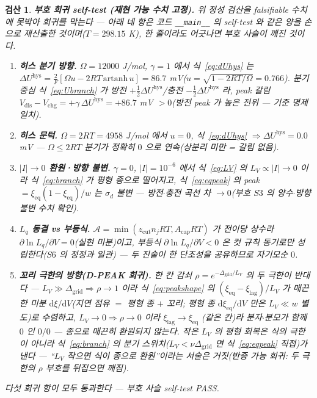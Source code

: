 \documentclass[11pt,a4paper]{article}
\newtheorem*{verifybox}{검산}
\newcommand{\dd}{\mathrm{d}}
\newcommand{\eq}{\mathrm{eq}}
\newcommand{\dis}{\mathrm{dis}}
\newcommand{\chg}{\mathrm{chg}}
\newcommand{\hys}{\mathrm{hys}}
\newcommand{\code}[1]{\texttt{#1}}
\begin{document}
\begin{verifybox}
\textbf{부호 회귀 self-test (재현 가능 수치 고정).} 위 정성 검산을 falsifiable 수치에 못박아 회귀를 막는다 — 아래
네 항은 코드 \code{\_\_main\_\_} 의 self-test 와 같은 양을 손으로 재산출한 것이며($T=298.15$ K), 한 줄이라도 어긋나면
부호 사슬이 깨진 것이다.
\begin{enumerate}[label=\textbf{R\arabic*.},leftmargin=2.6em,itemsep=1pt]
\item \textbf{히스 분기 방향.} $\Omega=12000$ J/mol, $\gamma=1$ 에서 식~\eqref{eq:dUhys} 는
$\Delta U^\hys=\frac{2}{F}[\Omega u-2RT\,\mathrm{artanh}\,u]=86.7$ mV($u=\sqrt{1-2RT/\Omega}=0.766$). 분기 중심
식~\eqref{eq:Ubranch} 가 방전 $+\tfrac12\Delta U^\hys$/충전 $-\tfrac12\Delta U^\hys$ 라, peak 갈림
$V_\dis-V_\chg=+\gamma\,\Delta U^\hys=+86.7$ mV $>0$(방전 peak 가 높은 전위 — 기준 명제 일치).
\item \textbf{히스 문턱.} $\Omega=2RT=4958$ J/mol 에서 $u=0$, 식~\eqref{eq:dUhys} $\Rightarrow\Delta U^\hys=0.0$ mV —
$\Omega\le2RT$ 분기가 정확히 $0$ 으로 연속(상분리 미만 = 갈림 없음).
\item \textbf{$|I|\!\to\!0$ 환원·방향 불변.} $\gamma=0$, $|I|=10^{-6}$ 에서 식~\eqref{eq:LV} 의 $L_V\propto|I|\to0$ 이라
식~\eqref{eq:branch} 가 평형 종으로 떨어지고, 식~\eqref{eq:eqpeak} 의 peak $=\xi_\eq(1-\xi_\eq)/w$ 는 $\sigma_d$ 불변 —
방전$\cdot$충전 곡선 차 $\to0$(부호 $S3$ 의 양수$\cdot$방향 불변 수치 확인).
\item \textbf{$L_q$ 동결 vs 부등식.} $\mathcal A=\min(z_\mathrm{cut}n_jRT,A_\mathrm{cap}RT)$ 가 전이당 상수라
$\partial\ln L_q/\partial V=0$(실현 미분)이고, 부등식 $\partial\ln L_q/\partial V<0$ 은 컷 규칙 동기로만 성립한다($S6$ 의
정정과 일관) — 두 진술이 한 단조성을 공유하므로 자기모순 $0$.
\item \textbf{꼬리 극한의 방향(D-PEAK 회귀).} 한 칸 감쇠 $\rho=e^{-\Delta_\mathrm{grid}/L_V}$ 의 두 극한이 반대다 —
$L_V\!\gg\!\Delta_\mathrm{grid}\Rightarrow\rho\to1$ 이라 식~\eqref{eq:peakshape} 의 $(\xi_\eq-\xi_\mathrm{lag})/L_V$ 가
매끈한 미분 $\dd\xi/\dd V$(지연 점유 $=$ 평형 종 $+$ 꼬리; 평형 종 $\dd\xi_\eq/\dd V$ 만은 $L_V\!\ll\!w$ 별도)로 수렴하고, $L_V\!\to\!0\Rightarrow\rho\to0$ 이라 $\xi_\mathrm{lag}\to\xi_\eq$
(같은 칸)라 분자$\cdot$분모가 함께 $0$ 인 $0/0$ — \emph{종으로 매끈히 환원되지 않는다}. 작은 $L_V$ 의 평형 회복은 식의
극한이 아니라 식~\eqref{eq:branch} 의 분기 스위치($L_V<\nu\Delta_\mathrm{grid}$ 면 식~\eqref{eq:eqpeak} 직접)가 낸다 —
``$L_V$ 작으면 식이 종으로 환원''이라는 서술은 거짓(반증 가능 회귀: 두 극한의 $\rho$ 부호를 뒤집으면 깨짐).
\end{enumerate}
다섯 회귀 항이 모두 통과한다 — 부호 사슬 self-test PASS.
\end{verifybox}
\end{document}
